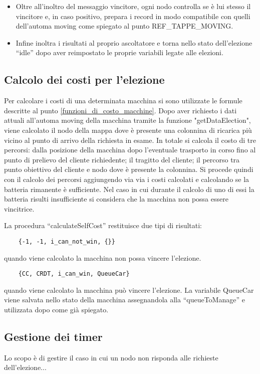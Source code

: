 \begin{itemize}
	\item Oltre all'inoltro del messaggio vincitore, ogni nodo controlla se è lui stesso il vincitore e, in caso positivo, prepara i record in modo compatibile con quelli dell'automa moving come spiegato al punto REF\_TAPPE\_MOVING.

	\item Infine inoltra i risultati al proprio ascoltatore e torna nello stato dell'elezione ``idle'' dopo aver reimpostato le proprie variabili legate alle elezioni.
\end{itemize}

\subsection{Calcolo dei costi per l'elezione}\label{implementazione_calcolo_costi}
Per calcolare i costi di una determinata macchina si sono utilizzate le formule descritte al punto \ref{funzioni_di_costo_macchine}. Dopo aver richiesto i dati attuali all'automa moving della macchina tramite la funzione "getDataElection", viene calcolato il nodo della mappa dove è presente una colonnina di ricarica più vicino al punto di arrivo della richiesta in esame.
In totale si calcola il costo di tre percorsi: dalla posizione della macchina dopo l'eventuale trasporto in corso fino al punto di prelievo del cliente richiedente; il tragitto del cliente; il percorso tra punto obiettivo del cliente e nodo dove è presente la colonnina.
Si procede quindi con il calcolo dei percorsi aggiungendo via via i costi calcolati e calcolando se la batteria rimanente è sufficiente. Nel caso in cui durante il calcolo di uno di essi la batteria risulti insufficiente si considera che la macchina non possa essere vincitrice.

La procedura ``calculateSelfCost'' restituisce due tipi di risultati:
\begin{lstlisting}
	{-1, -1, i_can_not_win, {}}
\end{lstlisting}
quando viene calcolato la macchina non possa vincere l'elezione.

\begin{lstlisting}
	{CC, CRDT, i_can_win, QueueCar}
\end{lstlisting}
quando viene calcolato la macchina può vincere l'elezione. La variabile QueueCar viene salvata nello stato della macchina assegnandola alla ``queueToManage'' e utilizzata dopo come già spiegato.

\subsection{Gestione dei timer}
Lo scopo è di gestire il caso in cui un nodo non risponda alle richieste dell'elezione...